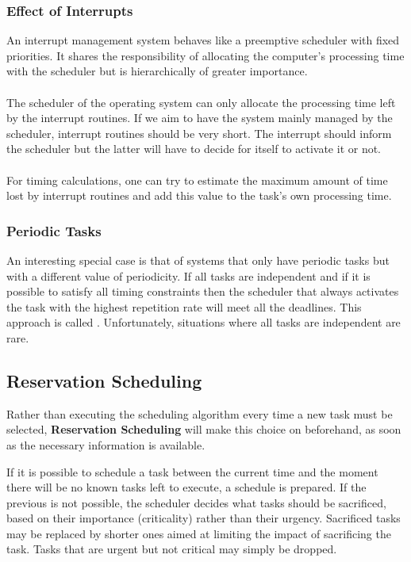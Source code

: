 \documentclass[../main.tex]{subfiles}
\begin{document}
\subsubsection{Effect of Interrupts}
An interrupt management system behaves like a preemptive scheduler with fixed priorities. It shares the responsibility of allocating the computer's processing time with the scheduler but is hierarchically of greater importance.
\\\\
The scheduler of the operating system can only allocate the processing time left by the interrupt routines. If we aim to have the system mainly managed by the scheduler, interrupt routines should be very short. The interrupt should inform the scheduler but the latter will have to decide for itself to activate it or not.
\\\\
For timing calculations, one can try to estimate the maximum amount of time lost by interrupt routines and add this value to the task's own processing time.

\subsubsection{Periodic Tasks}
An interesting special case is that of systems that only  have periodic tasks but with a different value of periodicity.
If all tasks are independent and if it is possible to satisfy all timing constraints then the scheduler that always activates the task with the highest repetition rate will meet all the deadlines.
This approach is called . Unfortunately, situations where all tasks are independent are rare.

\subsection{Reservation Scheduling}
Rather than executing the scheduling algorithm every time a new task must be selected, \textbf{Reservation Scheduling} will make this choice on beforehand, as soon as the necessary information is available.

If it is possible to schedule a task between the current time and the moment there will be no known tasks left to execute, a schedule is prepared. If the previous is not possible, the scheduler decides what tasks should be sacrificed, based on their importance (criticality) rather than their urgency. Sacrificed tasks may be replaced by shorter ones aimed at limiting the impact of sacrificing the task. Tasks that are urgent but not critical may simply be dropped.
\end{document}

